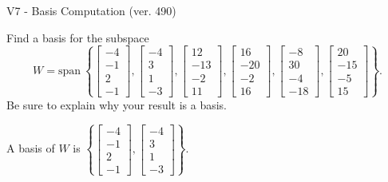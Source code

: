 \begin{exercise}
  \begin{exerciseTitle}V7 - Basis Computation (ver. 490)\end{exerciseTitle}
  \begin{exerciseStatement}
    Find a basis for the subspace 
\[W=\mathrm{span}\ \left\{\left[\begin{array}{r}
-4 \\
-1 \\
2 \\
-1
\end{array}\right] , \left[\begin{array}{r}
-4 \\
3 \\
1 \\
-3
\end{array}\right] , \left[\begin{array}{r}
12 \\
-13 \\
-2 \\
11
\end{array}\right] , \left[\begin{array}{r}
16 \\
-20 \\
-2 \\
16
\end{array}\right] , \left[\begin{array}{r}
-8 \\
30 \\
-4 \\
-18
\end{array}\right] , \left[\begin{array}{r}
20 \\
-15 \\
-5 \\
15
\end{array}\right]\right\}.\]
 Be sure to explain why your result is a basis.


  \end{exerciseStatement}
  \begin{exerciseAnswer}
   A basis of \(W\) is  \(\left\{\left[\begin{array}{r}
-4 \\
-1 \\
2 \\
-1
\end{array}\right] , \left[\begin{array}{r}
-4 \\
3 \\
1 \\
-3
\end{array}\right]\right\}\).
  


  \end{exerciseAnswer}
\end{exercise}